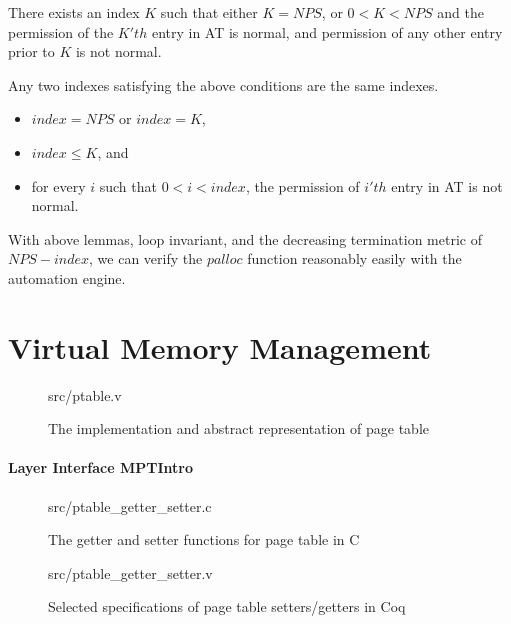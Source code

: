 \begin{lemma}[Termination] There exists an index $K$ such that either $K=NPS$, or $0<K<NPS$ and the permission of the $K'th$ entry
in AT is normal, and permission of any other entry prior to $K$ is not normal.
\end{lemma}

\begin{lemma} [Unique] Any two indexes satisfying the above conditions are the same indexes.
\end{lemma}

\begin{definition} 
\begin{itemize}
\item $index=NPS$ or $index=K$,
\item $index\le K$, and
\item for every $i$ such that $0<i<index$, the permission of $i'th$ entry in AT is not normal.
\end{itemize}
\end{definition}

With above lemmas, loop invariant, and the decreasing termination metric of $NPS-index$, we can verify
the $palloc$ function reasonably easily with the automation engine.


\section{Virtual Memory Management}

\begin{figure}
	 {src/ptable.v}
	\caption{The implementation and abstract representation of page table}
	\label{fig:ptable_v}
\end{figure}

\paragraph{Layer Interface MPTIntro}

\begin{figure}
	 {src/ptable_getter_setter.c}
	\caption{The getter and setter functions for page table in C}
	\label{fig:ptable_getter_setter_c}
\end{figure}

\begin{figure}
	 {src/ptable_getter_setter.v}
	\caption{Selected specifications of page table setters/getters in Coq}
	\label{fig:ptable_getter_setter_v}
\end{figure}

